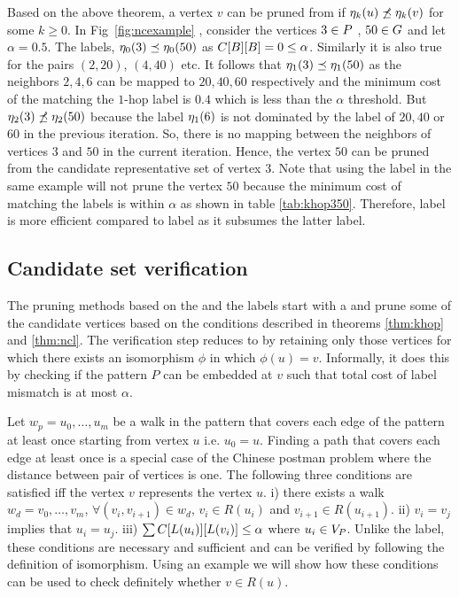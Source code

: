 Based on the above theorem, a vertex $v$ can be pruned from \CR if $\eta_{k}(u)
\not\preceq \eta_{k}(v)$ for some $k \geq 0$. In Fig~\ref{fig:ncexample} ,
consider the vertices $3 \in P$ , $50 \in G$ and let $\alpha = 0.5$. The
\ncl labels, $\eta_{0}(3) \preceq \eta_{0}(50)$ as ${C}[B][B] = 0 \leq
\alpha$.  Similarly it is also true for the pairs $(2, 20)$, $(4, 40)$ etc. It
follows that $\eta_{1}(3) \preceq \eta_{1}(50)$ as the neighbors $2, 4, 6$ can
be mapped to $20, 40, 60$ respectively and  the minimum cost of the matching the
$1$-hop label is $0.4$ which is less than the $\alpha$ threshold. But
$\eta_{2}(3) \not\preceq \eta_{2}(50)$ because the \ncl label $\eta_{1}(6)$
is not dominated by the \ncl label of $20, 40$ or  $60$ in the previous
iteration. So, there is no mapping between the neighbors of vertices $3$ and
$50$ in the current iteration. Hence, the vertex $50$ can be pruned from the
candidate representative set of vertex $3$.  Note that using the \khop label in
the same example will not prune the vertex $50$ because the minimum cost of
matching the \khop labels is within $\alpha$ as shown in table
\ref{tab:khop350}. Therefore, \ncl label is more efficient compared to \khop
label as it subsumes the latter label.

\subsection{Candidate set verification} \label{sec:verification} The pruning
methods based on the \khop and the \ncl labels start with a \CR and prune some
of the candidate vertices based on the conditions described in theorems
\ref{thm:khop} and \ref{thm:ncl}.  The verification step reduces \CR to \RS by
retaining only those vertices for which there exists an isomorphism $\phi$ in
which $\phi(u) = v$.  Informally, it does this by checking if the pattern $P$ can be
embedded at $v$ such that total cost of label mismatch is at most $\alpha$.


Let $w_p = u_0,\ldots, u_m$ be a walk in the pattern that covers each edge of
the pattern at least once starting from vertex $u$ i.e. $u_0 = u$. Finding a
path that covers each edge at least once is a special case of the Chinese
postman problem \cite{chinesepostman} where the distance between pair of
vertices is one. The following three conditions are satisfied iff the vertex $v$
represents the vertex $u$. i) there exists a walk $w_d = v_0,\ldots, v_m$,
$\forall (v_i, v_{i+1}) \in w_d$, $v_i \in R(u_i)$ and $v_{i+1} \in R(u_{i+1})$.
ii) $v_i = v_j$ implies that $u_i = u_j$. iii) $\sum{C}[L(u_i)][L(v_i)]
\leq \alpha$ where $u_i \in V_P$. Unlike the \ncl label, 
these conditions are necessary and sufficient and can be verified by following
the definition of isomorphism. Using an example we will
show how these conditions can be used to check definitely whether $v \in R(u)$.

